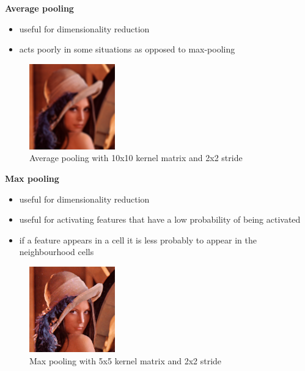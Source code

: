 \newpage
\textbf{Average pooling}
\begin{itemize}
	\item{useful for dimensionality reduction}
	\item{acts poorly in some situations as opposed to max-pooling}
\end{itemize}
\begin{figure}[h]
	\begin{center}
		\includegraphics[width=140px,height=140px]{src/img/state/lena-avgpooling}
		\caption{Average pooling with 10x10 kernel matrix and 2x2 stride} \label{fig:lena-avgpooling}
    \end{center}
\end{figure}



\textbf{Max pooling}

\begin{itemize}
	\item{useful for dimensionality reduction}
	\item{useful for activating features that have a low probability of being activated\cite{maxpooling}}
	\item{if a feature appears in a cell it is less probably to appear in the neighbourhood cells}
\end{itemize}

\begin{figure}[h]
	\begin{center}
		\includegraphics[width=140px,height=140px]{src/img/state/lena-maxpooling}
		\caption{Max pooling with 5x5 kernel matrix and 2x2 stride} \label{fig:lena-avgpooling}
    \end{center}
\end{figure}


